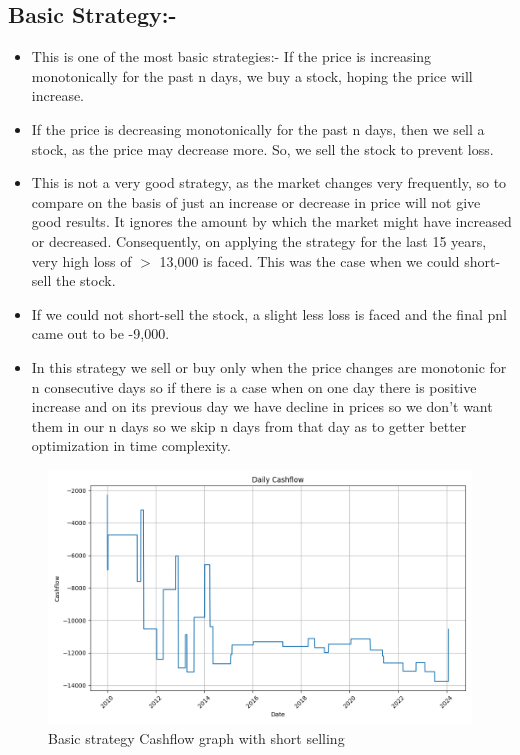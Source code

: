 \documentclass[11pt]{article}
\begin{document}
\subsection{Basic Strategy:-}
\begin{itemize}
    \item This is one of the most basic strategies:- If the price is increasing monotonically for the past n days, we buy a stock, hoping the price will increase.
    \item If the price is decreasing monotonically for the past n days, then we sell a stock, as the price may decrease more. So, we sell the stock to prevent loss.
    \item This is not a very good strategy, as the market changes very frequently, so to compare on the basis of just an increase or decrease in price will not give good results. It ignores the amount by which the market might have increased or decreased. Consequently, on applying the strategy for the last 15 years, very high loss of $>$ 13,000 is faced. This was the case when we could short-sell the stock.
    \item If we could not short-sell the stock, a slight less loss is faced and the final pnl came out to be -9,000.
    \item In this strategy we sell or buy only when the price changes are monotonic for n consecutive days so if there is a case when on one day there is positive increase and on its previous day we have decline in prices so we don't want them in our n days so we skip n days from that day as to getter better optimization in time complexity.
\end{itemize}

\begin{figure}[H]
  \centering
  \includegraphics[width=1\textwidth]{Basic_with_short.png}
  \caption{Basic strategy Cashflow graph with short selling}
\end{figure}
\end{document}
